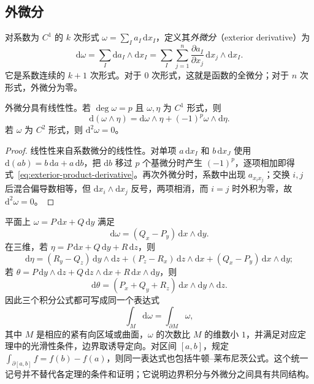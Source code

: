 \subsection{外微分}
\label{subsec:exterior-derivative}

\begin{definition}
\label{def:exterior-derivative}
对系数为 $C^1$ 的 $k$ 次形式 $\omega=\sum_Ia_I\,\mathrm dx_I$，定义其\emph{外微分}（exterior derivative）为
\begin{equation}
\label{eq:exterior-derivative-definition}
    \mathrm d\omega=\sum_I\mathrm da_I\wedge\mathrm dx_I
    =\sum_I\sum_{j=1}^n\frac{\partial a_I}{\partial x_j}
      \,\mathrm dx_j\wedge\mathrm dx_I.
\end{equation}
它是系数连续的 $k+1$ 次形式。对于 $0$ 次形式，这就是函数的全微分；对于 $n$ 次形式，外微分为零。
\end{definition}

\begin{proposition}
\label{prop:exterior-derivative-rules}
外微分具有线性性。若 $\deg\omega=p$ 且 $\omega,\eta$ 为 $C^1$ 形式，则
\begin{equation}
\label{eq:exterior-product-derivative}
    \mathrm d(\omega\wedge\eta)
    =\mathrm d\omega\wedge\eta+(-1)^p\omega\wedge\mathrm d\eta.
\end{equation}
若 $\omega$ 为 $C^2$ 形式，则 $\mathrm d^2\omega=0$。
\end{proposition}
\begin{proof}
线性性来自系数微分的线性性。对单项 $a\,\mathrm dx_I$ 和 $b\,\mathrm dx_J$ 使用 $\mathrm d(ab)=b\,\mathrm da+a\,\mathrm db$，把 $\mathrm db$ 移过 $p$ 个基微分时产生 $(-1)^p$，逐项相加即得式~\eqref{eq:exterior-product-derivative}。再次外微分时，系数中出现 $a_{x_ix_j}$；交换 $i,j$ 后混合偏导数相等，但 $\mathrm dx_i\wedge\mathrm dx_j$ 反号，两项相消，而 $i=j$ 时外积为零，故 $\mathrm d^2\omega=0$。
\end{proof}

平面上 $\omega=P\,\mathrm dx+Q\,\mathrm dy$ 满足
\[
    \mathrm d\omega=(Q_x-P_y)\,\mathrm dx\wedge\mathrm dy.
\]
在三维，若 $\eta=P\,\mathrm dx+Q\,\mathrm dy+R\,\mathrm dz$，则
\[
    \mathrm d\eta=(R_y-Q_z)\,\mathrm dy\wedge\mathrm dz
      +(P_z-R_x)\,\mathrm dz\wedge\mathrm dx
      +(Q_x-P_y)\,\mathrm dx\wedge\mathrm dy;
\]
若 $\theta=P\,\mathrm dy\wedge\mathrm dz+Q\,\mathrm dz\wedge\mathrm dx+R\,\mathrm dx\wedge\mathrm dy$，则
\[
    \mathrm d\theta=(P_x+Q_y+R_z)\,\mathrm dx\wedge\mathrm dy\wedge\mathrm dz.
\]
因此三个积分公式都可写成同一个表达式
\begin{equation}
\label{eq:generalized-stokes-formula}
    \int_M\mathrm d\omega=\int_{\partial M}\omega,
\end{equation}
其中 $M$ 是相应的紧有向区域或曲面，$\omega$ 的次数比 $M$ 的维数小 $1$，并满足对应定理中的光滑性条件，边界取诱导定向。对区间 $[a,b]$，规定 $\int_{\partial[a,b]}f=f(b)-f(a)$，则同一表达式也包括牛顿--莱布尼茨公式。这个统一记号并不替代各定理的条件和证明；它说明边界积分与外微分之间具有共同结构。

